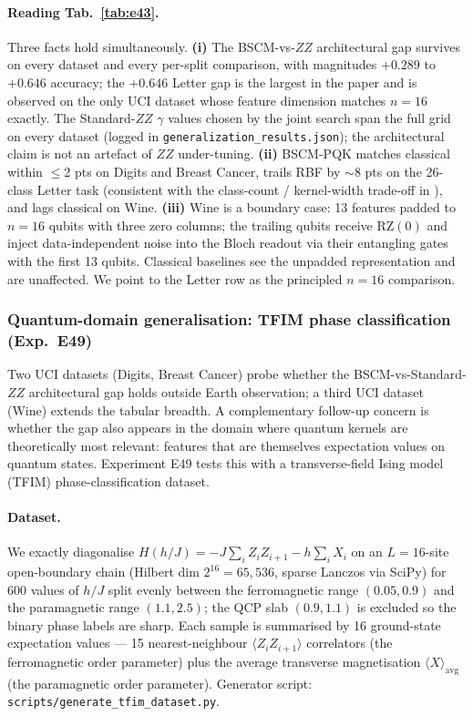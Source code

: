 \documentclass[pdflatex,sn-mathphys]{sn-jnl}
\theoremstyle{plain}
\theoremstyle{remark}
\theoremstyle{definition}
\begin{document}
\paragraph{Reading Tab.~\ref{tab:e43}.}
Three facts hold simultaneously.  \textbf{(i)} The BSCM-vs-$ZZ$ architectural gap survives on every dataset and every per-split comparison, with magnitudes $+0.289$ to $+0.646$ accuracy; the $+0.646$ Letter gap is the largest in the paper and is observed on the only UCI dataset whose feature dimension matches $n=16$ exactly.  The Standard-$ZZ$ $\gamma$ values chosen by the joint search span the full grid on every dataset (logged in \texttt{generalization\_results.json}); the architectural claim is not an artefact of $ZZ$ under-tuning.  \textbf{(ii)} BSCM-PQK matches classical within $\le$2 pts on Digits and Breast Cancer, trails RBF by $\sim$8 pts on the 26-class Letter task (consistent with the class-count / kernel-width trade-off in \cite{schnabel2025,kubler2021}), and lags classical on Wine.  \textbf{(iii)} Wine is a boundary case: 13 features padded to $n=16$ qubits with three zero columns; the trailing qubits receive $\mathrm{RZ}(0)$ and inject data-independent noise into the Bloch readout via their entangling gates with the first 13 qubits.  Classical baselines see the unpadded representation and are unaffected.  We point to the Letter row as the principled $n=16$ comparison.

\subsubsection{Quantum-domain generalisation: TFIM phase classification (Exp.\ E49)}
\label{sec:e49-tfim}
Two UCI datasets (Digits, Breast Cancer) probe whether the BSCM-vs-Standard-$ZZ$ architectural gap holds outside Earth observation; a third UCI dataset (Wine) extends the tabular breadth.  A complementary follow-up concern is whether the gap also appears in the domain where quantum kernels are theoretically most relevant: features that are themselves expectation values on quantum states.  Experiment E49 tests this with a transverse-field Ising model (TFIM) phase-classification dataset.

\paragraph{Dataset.}
We exactly diagonalise $H(h/J) = -J\sum_i Z_iZ_{i+1} - h\sum_i X_i$ on an $L=16$-site open-boundary chain (Hilbert dim $2^{16}=65{,}536$, sparse Lanczos via SciPy) for 600 values of $h/J$ split evenly between the ferromagnetic range $(0.05, 0.9)$ and the paramagnetic range $(1.1, 2.5)$; the QCP slab $(0.9, 1.1)$ is excluded so the binary phase labels are sharp.  Each sample is summarised by 16 ground-state expectation values --- 15 nearest-neighbour $\langle Z_i Z_{i+1}\rangle$ correlators (the ferromagnetic order parameter) plus the average transverse magnetisation $\langle X\rangle_\text{avg}$ (the paramagnetic order parameter).  Generator script: \texttt{scripts/generate\_tfim\_dataset.py}.
\end{document}
